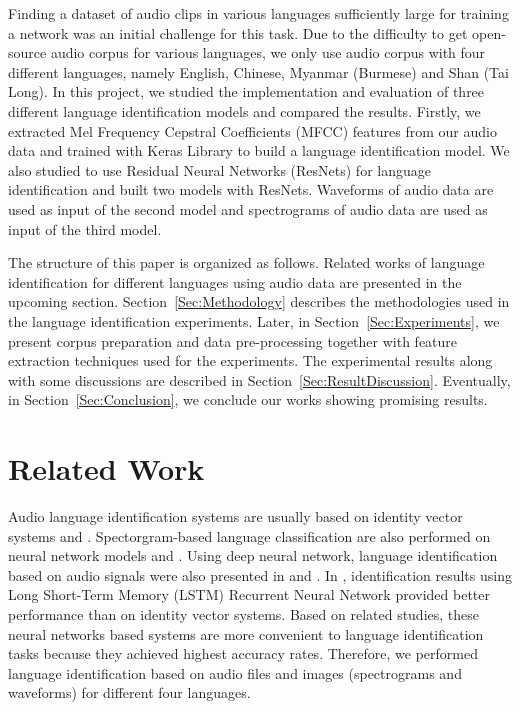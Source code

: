 \documentclass[conference]{IEEEtran}
\begin{document}
Finding a dataset of audio clips in various languages sufficiently large for training a network was an initial challenge for this task. Due to the difficulty to get open-source audio corpus for various languages, we only use audio corpus with four different languages, namely English, Chinese, Myanmar (Burmese) and Shan (Tai Long).
In this project, we studied the implementation and evaluation of three different language identification models and compared the results. Firstly, we extracted Mel Frequency Cepstral Coefficients (MFCC) features from our audio data and trained with Keras Library to build a language identification model. We also studied to use Residual Neural Networks (ResNets) for language identification and built two models with ResNets. Waveforms of audio data are used as input of the second model and spectrograms of audio data are used as input of the third model. 

The structure of this paper is organized as follows. Related works of language identification for different languages using audio data are presented in the upcoming section. Section~\ref{Sec:Methodology} describes the methodologies used in the language identification experiments. Later, in Section~\ref{Sec:Experiments}, we present corpus preparation and data pre-processing together with feature extraction techniques used for the experiments. The experimental results along with some discussions are described in Section~\ref{Sec:ResultDiscussion}. Eventually, in Section~\ref{Sec:Conclusion}, we conclude our works showing promising results.

\section{Related Work}\label{Sec:RelatedWork}
Audio language identification systems are usually based on identity vector systems \cite{b4} and \cite{b9}. Spectorgram-based language classification are also performed on neural network models\cite{b1,b2} and \cite{b11}. Using deep neural network, language identification based on audio signals were also presented in \cite{b5,b8} and \cite{b10}. In \cite{b12}, identification results using Long Short-Term Memory (LSTM) Recurrent Neural Network provided better performance than on identity vector systems. Based on related studies, these neural networks based systems are more convenient to language identification tasks because they achieved highest accuracy rates. Therefore, we performed language identification based on audio files and images (spectrograms and waveforms) for different four languages.
\end{document}

